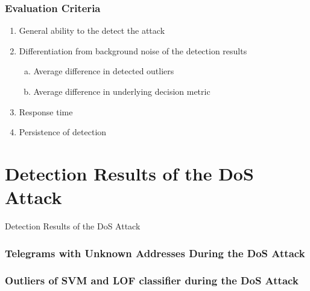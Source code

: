 \begin{frame}[c]
	\frametitle{Evaluation Criteria}
	
	\begin{enumerate}
		\item General ability to the detect the attack
		\item Differentiation from background noise of the detection results
		\begin{enumerate}[a)]
			\item Average difference in detected outliers 
			\item Average difference in underlying decision metric
		\end{enumerate}
		\item Response time 
		\item Persistence of detection
	\end{enumerate}
	
\end{frame}

\section{Detection Results of the DoS Attack}
\begin{frame}[c]
	\centering
	\LARGE Detection Results of the DoS Attack
	
	\note{}
\end{frame}

\begin{frame}[c]
	\frametitle{Telegrams with Unknown Addresses During the DoS Attack}
	
\end{frame}

\begin{frame}[c]
	\frametitle{Outliers of SVM and LOF classifier during the DoS Attack}
	
\end{frame}

